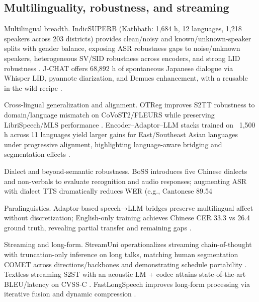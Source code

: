 \subsection{Multilinguality, robustness, and streaming} \label{subsec:Multilinguality, robustness, and streaming}

Multilingual breadth. IndicSUPERB (Kathbath: 1,684 h, 12 languages, 1,218 speakers across 203 districts) provides clean/noisy and known/unknown-speaker splits with gender balance, exposing ASR robustness gaps to noise/unknown speakers, heterogeneous SV/SID robustness across encoders, and strong LID robustness \cite{entry2025indicsuperbspeechprocessinguniversalperf}. J‑CHAT offers 68,892 h of spontaneous Japanese dialogue via Whisper LID, pyannote diarization, and Demucs enhancement, with a reusable in-the-wild recipe \cite{nakata2024jchatjapaneselargescalespokendialoguecor}.

Cross-lingual generalization and alignment. OTReg improves S2TT robustness to domain/language mismatch on CoVoST2/FLEURS while preserving LibriSpeech/MLS performance \cite{xu2025optimaltransportregularizationspeechtext}. Encoder–Adaptor–LLM stacks trained on ~1,500 h across 11 languages yield larger gains for East/Southeast Asian languages under progressive alignment, highlighting language-aware bridging and segmentation effects \cite{nguyen2025qwenvsgemmaintegrationwhispercomparative}.

Dialect and beyond-semantic robustness. BoSS introduces five Chinese dialects and non‑verbals to evaluate recognition and audio responses; augmenting ASR with dialect TTS dramatically reduces WER (e.g., Cantonese 89.54%

Paralinguistics. Adaptor-based speech→LLM bridges preserve multilingual affect without discretization; English-only training achieves Chinese CER 33.3 vs 26.4 ground truth, revealing partial transfer and remaining gaps \cite{wang2024blspemotowardsempatheticlargespeechlangu,zhu2024generativepretrainedspeechlanguagemodele}.

Streaming and long-form. StreamUni operationalizes streaming chain-of-thought with truncation-only inference on long talks, matching human segmentation COMET across directions/backbones and demonstrating schedule portability \cite{guo2025streamuniachievingstreamingspeechtransla}. Textless streaming S2ST with an acoustic LM + codec attains state-of-the-art BLEU/latency on CVSS‑C \cite{zhao2024textlessstreamingspeechtranslationsemant}. FastLongSpeech improves long-form processing via iterative fusion and dynamic compression \cite{guo2025fastlongspeechenhancinglargespeechlangua}.

